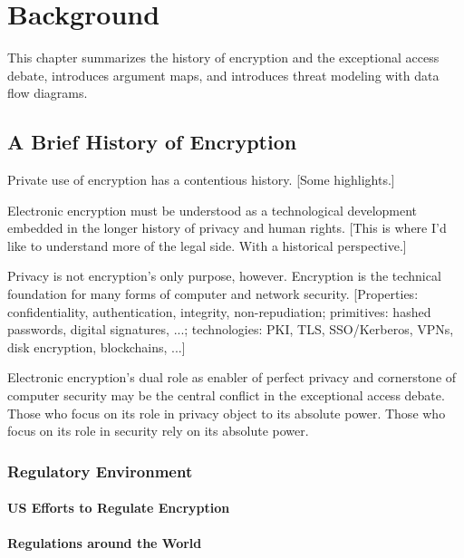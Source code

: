 \chapter{Background}
\label{chap-background}

This chapter summarizes the history of encryption and the exceptional access debate, introduces argument maps, and
introduces threat modeling with data flow diagrams.

\section{A Brief History of Encryption}
\label{sec-history}

Private use of encryption has a contentious history. [Some highlights.]

Electronic encryption must be understood as a technological development embedded in the longer history of privacy and
human rights. [This is where I'd like to understand more of the legal side. With a historical perspective.]

Privacy is not encryption's only purpose, however. Encryption is the technical foundation for many forms of computer and
network security. [Properties: confidentiality, authentication, integrity, non-repudiation; primitives: hashed
passwords, digital signatures, ...; technologies: PKI, TLS, SSO/Kerberos, VPNs, disk encryption, blockchains, ...]

Electronic encryption's dual role as enabler of perfect privacy and cornerstone of computer security may be the central
conflict in the exceptional access debate. Those who focus on its role in privacy object to its absolute power. Those
who focus on its role in security rely on its absolute power.


\subsection{Regulatory Environment}
\label{sec-reg-environment}

\subsubsection*{US Efforts to Regulate Encryption}

\subsubsection*{Regulations around the World}

